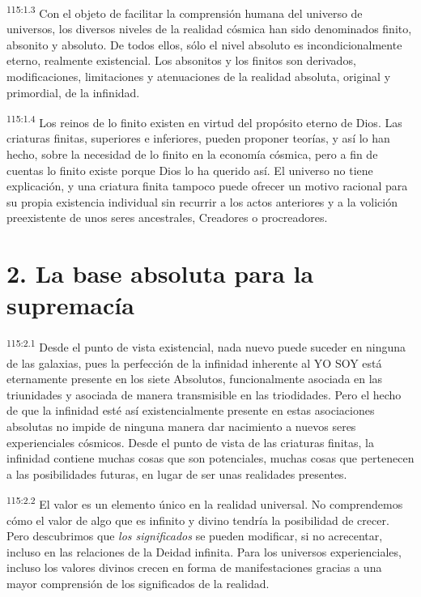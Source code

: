 \par
\textsuperscript{115:1.3} Con el objeto de facilitar la comprensión humana del universo de universos, los diversos niveles de la realidad cósmica han sido denominados finito, absonito y absoluto. De todos ellos, sólo el nivel absoluto es incondicionalmente eterno, realmente existencial. Los absonitos y los finitos son derivados, modificaciones, limitaciones y atenuaciones de la realidad absoluta, original y primordial, de la infinidad.

\par
\textsuperscript{115:1.4} Los reinos de lo finito existen en virtud del propósito eterno de Dios. Las criaturas finitas, superiores e inferiores, pueden proponer teorías, y así lo han hecho, sobre la necesidad de lo finito en la economía cósmica, pero a fin de cuentas lo finito existe porque Dios lo ha querido así. El universo no tiene explicación, y una criatura finita tampoco puede ofrecer un motivo racional para su propia existencia individual sin recurrir a los actos anteriores y a la volición preexistente de unos seres ancestrales, Creadores o procreadores.

\section*{2. La base absoluta para la supremacía}
\par
\textsuperscript{115:2.1} Desde el punto de vista existencial, nada nuevo puede suceder en ninguna de las galaxias, pues la perfección de la infinidad inherente al YO SOY está eternamente presente en los siete Absolutos, funcionalmente asociada en las triunidades y asociada de manera transmisible en las triodidades. Pero el hecho de que la infinidad esté así existencialmente presente en estas asociaciones absolutas no impide de ninguna manera dar nacimiento a nuevos seres experienciales cósmicos. Desde el punto de vista de las criaturas finitas, la infinidad contiene muchas cosas que son potenciales, muchas cosas que pertenecen a las posibilidades futuras, en lugar de ser unas realidades presentes.

\par
\textsuperscript{115:2.2} El valor es un elemento único en la realidad universal. No comprendemos cómo el valor de algo que es infinito y divino tendría la posibilidad de crecer. Pero descubrimos que \textit{los significados} se pueden modificar, si no acrecentar, incluso en las relaciones de la Deidad infinita. Para los universos experienciales, incluso los valores divinos crecen en forma de manifestaciones gracias a una mayor comprensión de los significados de la realidad.


